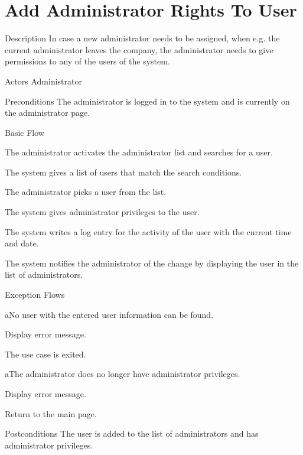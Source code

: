 \section{Add Administrator Rights To User}

%
\begin{cpart}{Description}
In case a new administrator needs to be assigned, when e.g. the current administrator  leaves the company, the administrator needs to give permissions to any of the users of the system.
\end{cpart}


%
\begin{cpart}{Actors}
Administrator
\end{cpart}

%
\begin{cpart}{Preconditions}
The administrator is logged in to the system and is currently on the administrator page.
\end{cpart}

%
\begin{cpartList}{Basic Flow}
  \item The administrator activates the administrator list and searches for a user.
  \item The system gives a list of users that match the search conditions.
  \item The administrator picks a user from the list.
  \item The system gives administrator privileges to the user.
  \item The system writes a log entry for the activity of the user with the current time and date.
  \item The system notifies the administrator of the change by displaying the user in the list of administrators.
\end{cpartList}

%
\begin{cpartList}{Exception Flows}
  \begin{innerList}{2}{a}{No user with the entered user information can be found.}
    \item Display error message.
    \item The use case is exited.
  \end{innerList}

  \begin{innerList}{4}{a}{The administrator does no longer have administrator privileges.}
    \item Display error message.
    \item Return to the main page.
  \end{innerList}
\end{cpartList}

%
\begin{cpart}{Postconditions}
The user is added to the list of administrators and has administrator privileges.
\end{cpart}

